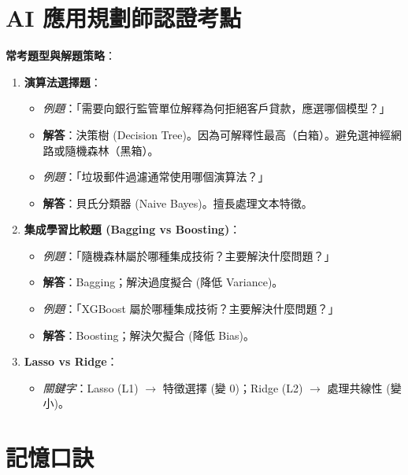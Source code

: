 \documentclass[
  letterpaper,
  DIV=11,
  numbers=noendperiod]{scrreprt}
\providecommand{\tightlist}{%
  \setlength{\itemsep}{0pt}\setlength{\parskip}{0pt}}
\begin{document}
\section{AI
應用規劃師認證考點}\label{ai-ux61c9ux7528ux898fux5283ux5e2bux8a8dux8b49ux8003ux9ede-4}

\textbf{常考題型與解題策略}：

\begin{enumerate}
\def\labelenumi{\arabic{enumi}.}
\tightlist
\item
  \textbf{演算法選擇題}：

  \begin{itemize}
  \tightlist
  \item
    \emph{例題}：「需要向銀行監管單位解釋為何拒絕客戶貸款，應選哪個模型？」
  \item
    \textbf{解答}：決策樹 (Decision
    Tree)。因為可解釋性最高（白箱）。避免選神經網路或隨機森林（黑箱）。
  \item
    \emph{例題}：「垃圾郵件過濾通常使用哪個演算法？」
  \item
    \textbf{解答}：貝氏分類器 (Naive Bayes)。擅長處理文本特徵。
  \end{itemize}
\item
  \textbf{集成學習比較題 (Bagging vs Boosting)}：

  \begin{itemize}
  \tightlist
  \item
    \emph{例題}：「隨機森林屬於哪種集成技術？主要解決什麼問題？」
  \item
    \textbf{解答}：Bagging；解決過度擬合 (降低 Variance)。
  \item
    \emph{例題}：「XGBoost 屬於哪種集成技術？主要解決什麼問題？」
  \item
    \textbf{解答}：Boosting；解決欠擬合 (降低 Bias)。
  \end{itemize}
\item
  \textbf{Lasso vs Ridge}：

  \begin{itemize}
  \tightlist
  \item
    \emph{關鍵字}：Lasso (L1) \(\rightarrow\) 特徵選擇 (變 0)；Ridge
    (L2) \(\rightarrow\) 處理共線性 (變小)。
  \end{itemize}
\end{enumerate}

\section{記憶口訣}\label{ux8a18ux61b6ux53e3ux8a23-4}
\end{document}
